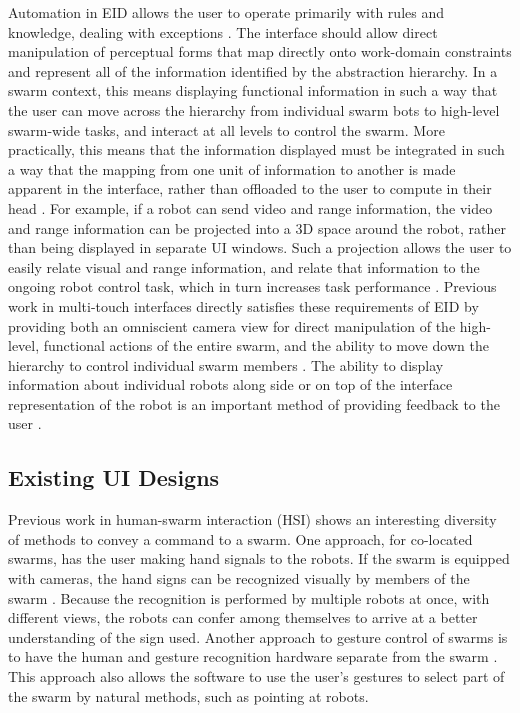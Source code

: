 Automation in EID allows the user to operate primarily with rules and knowledge, dealing with exceptions \citep{vicente2002ecological}.
The interface should allow direct manipulation of perceptual forms that map directly onto work-domain constraints and represent all of the information identified by the abstraction hierarchy. 
In a swarm context, this means displaying functional information in such a way that the user can move across the hierarchy from individual swarm bots to high-level swarm-wide tasks, and interact at all levels to control the swarm. 
More practically, this means that the information displayed must be integrated in such a way that the mapping from one unit of information to another is made apparent in the interface, rather than offloaded to the user to compute in their head \citep{yanco2004beyond}. 
For example, if a robot can send video and range information, the video and range information can be projected into a 3D space around the robot, rather than being displayed in separate UI windows.
Such a projection allows the user to easily relate visual and range information, and relate that information to the ongoing robot control task, which in turn increases task performance \citep{ricks2004ecological}.
Previous work in multi-touch interfaces directly satisfies these requirements of EID by providing both an omniscient camera view for direct manipulation of the high-level, functional actions of the entire swarm, and the ability to move down the hierarchy to control individual swarm members \citep{Micire:2009:ANG:1731903.1731912}.
The ability to display information about individual robots along side or on top of the interface representation of the robot is an important method of providing feedback to the user \citep{Kato:2009:MIC:1520340.1520500}. 

\subsection{Existing UI Designs}

Previous work in human-swarm interaction (HSI) shows an interesting diversity of methods to convey a command to a swarm. 
One approach, for co-located swarms, has the user making hand signals to the robots. 
If the swarm is equipped with cameras, the hand signs can be recognized visually by members of the swarm \citep{nagi2014online, giusti2012human, nagi2014human}. 
Because the recognition is performed by multiple robots at once, with different views, the robots can confer among themselves to arrive at a better understanding of the sign used.
Another approach to gesture control of swarms is to have the human and gesture recognition hardware separate from the swarm \citep{alonso2015gesture}.
This approach also allows the software to use the user's gestures to select part of the swarm by natural methods, such as pointing at robots. 

